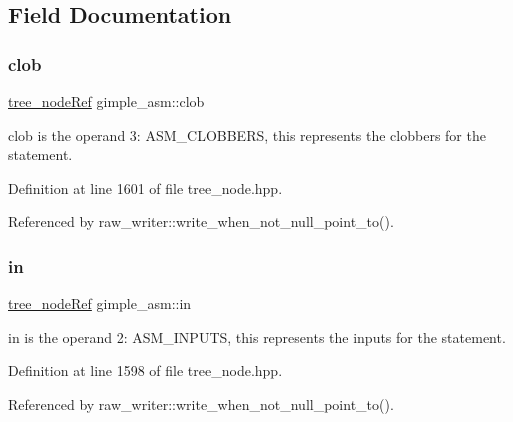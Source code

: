 \subsection{Field Documentation}
\mbox{\label{structgimple__asm_af8b683346be8e133805b0398db9de8b7}} 
\subsubsection{\texorpdfstring{clob}{clob}}
{\footnotesize\ttfamily \hyperlink{tree__node_8hpp_a6ee377554d1c4871ad66a337eaa67fd5}{tree\+\_\+node\+Ref} gimple\+\_\+asm\+::clob}



clob is the operand 3\+: A\+S\+M\+\_\+\+C\+L\+O\+B\+B\+E\+RS, this represents the clobbers for the statement. 



Definition at line 1601 of file tree\+\_\+node.\+hpp.



Referenced by raw\+\_\+writer\+::write\+\_\+when\+\_\+not\+\_\+null\+\_\+point\+\_\+to().

\mbox{\label{structgimple__asm_a78a8fb3c379a345757761c890a18bfb8}} 
\subsubsection{\texorpdfstring{in}{in}}
{\footnotesize\ttfamily \hyperlink{tree__node_8hpp_a6ee377554d1c4871ad66a337eaa67fd5}{tree\+\_\+node\+Ref} gimple\+\_\+asm\+::in}



in is the operand 2\+: A\+S\+M\+\_\+\+I\+N\+P\+U\+TS, this represents the inputs for the statement. 



Definition at line 1598 of file tree\+\_\+node.\+hpp.



Referenced by raw\+\_\+writer\+::write\+\_\+when\+\_\+not\+\_\+null\+\_\+point\+\_\+to().

\mbox{\label{structgimple__asm_ada466d4ec1f1f8779851948cc7761d0d}} 
